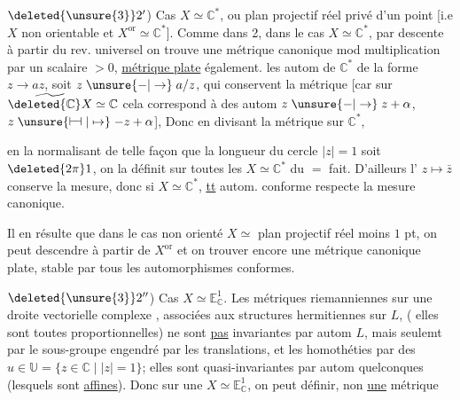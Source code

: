 $\deleted{\unsure{3}}2'$) Cas $X\simeq\mathbb C^*$, ou  plan projectif réel privé d'un point [i.e $X$ non orientable et $X^{\mathrm{or}}\simeq\mathbb C^*$]. Comme dans 2, dans le cas $X\simeq\mathbb C^*$,  par descente à partir du rev. universel on trouve une métrique canonique mod multiplication par un scalaire $>0$, \uline{métrique plate} également.  les autom de $\mathbb C^*$   de la forme $z\longrightarrow az$, soit $z\mathrel{\unsure{-|\to}}a/z$, qui conservent la métrique [car sur $\widetilde{\deleted{\mathbb C}X}\simeq\mathbb C$ cela correspond à des autom $z\mathrel{\unsure{-|\to}}z+\alpha$, $z\mathrel{\unsure{\vdash\!\dashv|\mapsto}}-z+\alpha$], Donc en divisant la métrique sur $\mathbb C^*$, 


en la normalisant  de telle façon que la longueur du cercle $|z|=1$ soit $\deleted{2\pi}1$,  on la définit sur toutes les $X\simeq\mathbb C^*$ du $=$ fait. D'ailleurs l' $z\mapsto\bar z$  conserve la mesure, donc si $X\simeq\mathbb C^*$, \uline{tt} autom. conforme respecte la mesure canonique.

Il en résulte que dans le cas non orienté $X\simeq$ plan projectif réel moins $1$ pt, on peut descendre à partir de $X^{\mathrm{or}}$ et on trouver encore une métrique canonique plate, stable par tous les automorphismes conformes.

$\deleted{\unsure{3}}2''$) Cas $X\simeq\mathbb E^1_{\mathbb C}$. Les métriques riemanniennes sur une  droite vectorielle  complexe , associées aux structures hermitiennes  sur $L$, ( elles sont toutes proportionnelles) ne sont \uline{pas} invariantes par autom  $L$, mais seulemt par le sous-groupe engendré par les translations, et les  homothéties par des $u\in\mathbb U=\{z\in\mathbb C\mid |z|=1\}$; elles sont quasi-invariantes par autom quelconques (lesquels sont \uline{affines}). Donc sur une $X\simeq\mathbb E^1_{\mathbb C}$, on peut définir, non \uline{une} métrique

